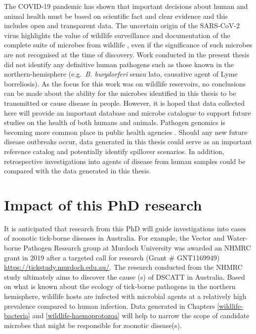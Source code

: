 \documentclass[a4paper, nobind]{templates/ociamthesis}
\begin{document}
The COVID-19 pandemic has shown that important decisions about human and animal health must be based on scientific fact and clear evidence and this includes open and transparent data.
The uncertain origin of the SARS-CoV-2 virus highlights the value of wildlife surveillance and documentation of the complete suite of microbes from wildlife \autocite{burkiOriginSARSCoV22020}, even if the significance of such microbes are not recognised at the time of discovery.
Work conducted in the present thesis did not identify any definitive human pathogens such as those known in the northern-hemisphere (e.g.~\emph{B. burgdorferi} sensu lato, causative agent of Lyme borreliosis).
As the focus for this work was on wildlife reservoirs, no conclusions can be made about the ability for the microbes identified in this thesis to be transmitted or cause disease in people.
However, it is hoped that data collected here will provide an important database and microbe catalogue to support future studies on the health of both humans and animals.
Pathogen genomics is becoming more common place in public health agencies \autocite{armstrongPathogenGenomicsPublic2019}.
Should any new future disease outbreaks occur, data generated in this thesis could serve as an important reference catalog and potentially identify spillover scenarios.
In addition, retrospective investigations into agents of disease from human samples could be compared with the data generated in this thesis.

\hypertarget{impact-of-this-phd-research}{%
\section{Impact of this PhD research}\label{impact-of-this-phd-research}}

It is anticipated that research from this PhD will guide investigations into cases of zoonotic tick-borne diseases in Australia.
For example, the Vector and Water-borne Pathogen Research group at Murdoch University was awarded an NHMRC grant in 2019 after a targeted call for research (Grant \# GNT1169949) \url{https://tickstudy.murdoch.edu.au/}.
The research conducted from the NHMRC study ultimately aims to discover the cause (s) of DSCATT in Australia.
Based on what is known about the ecology of tick-borne pathogens in the northern hemisphere, wildlife hosts are infected with microbial agents at a relatively high prevalence compared to human infection.
Data generated in Chapters \ref{wildlife-bacteria} and \ref{wildlife-haemoprotozoa} will help to narrow the scope of candidate microbes that might be responsible for zoonotic disease(s).
\end{document}
